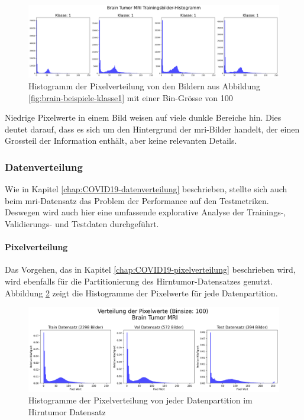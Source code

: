 \begin{figure}[H]
    \centering
    \includegraphics[width=\linewidth]{01-images/03-data/brain-klasse1-hist.png}
    \caption{Histogramm der Pixelverteilung von den Bildern aus Abbildung \ref{fig:brain-beispiele-klasse1} mit einer Bin-Grösse von 100}
    \label{fig:brain-klasse1-hist}
\end{figure}

Niedrige Pixelwerte in einem Bild weisen auf viele dunkle Bereiche hin. Dies deutet darauf, dass es sich um den Hintergrund der \acrshort{mri}-Bilder handelt, der einen Grossteil der Information enthält, aber keine relevanten Details.

\subsubsection{Datenverteilung} \label{chap:brain-datenverteilung}
Wie in Kapitel \ref{chap:COVID19-datenverteilung} beschrieben, stellte sich auch beim \acrshort{mri}-Datensatz das Problem der Performance auf den Testmetriken. Deswegen wird auch hier eine umfassende explorative Analyse der Trainings-, Validierungs- und Testdaten durchgeführt.

\newpage

\paragraph{Pixelverteilung} \label{chap:brain-pixelverteilung}
Das Vorgehen, das in Kapitel \ref{chap:COVID19-pixelverteilung} beschrieben wird, wird ebenfalls für die Partitionierung des Hirntumor-Datensatzes genutzt. Abbildung \ref{fig:brain-datapartition-pixelverteilung-histo} zeigt die Histogramme der Pixelwerte für jede Datenpartition.

\begin{figure}[H]
    \centering
    \includegraphics[width=\linewidth]{01-images/03-data/brain-Pixelverteilung-Partitionen.png}
    \caption{Histogramme der Pixelverteilung von jeder Datenpartition im Hirntumor Datensatz}
    \label{fig:brain-datapartition-pixelverteilung-histo}
\end{figure}

